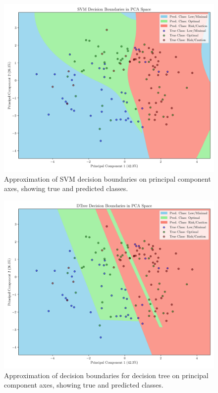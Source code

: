 \documentclass[conference]{IEEEtran}
\begin{document}
\begin{figure}[H]
    \centering
    \includegraphics[width=1\linewidth]{assets/pca_svm.png}
    \caption{Approximation of SVM decision boundaries on principal component axes, showing true and predicted classes.}
    \label{pca_svm}
\end{figure} %

\begin{figure}[H]
    \centering
    \includegraphics[width=1\linewidth]{assets/pca_dtree.png}
    \caption{Approximation of decision boundaries for decision tree on principal component axes, showing true and predicted classes.}
    \label{pca_dtree}
\end{figure} %
\end{document}
